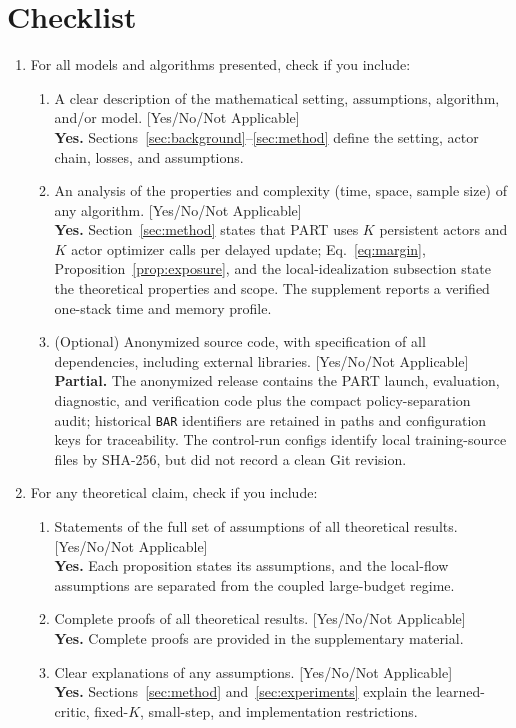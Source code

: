 \section*{Checklist}

\begin{enumerate}

  \item For all models and algorithms presented, check if you include:
  \begin{enumerate}
    \item A clear description of the mathematical setting, assumptions, algorithm, and/or model. [Yes/No/Not Applicable]\\
    \textbf{Yes.} Sections~\ref{sec:background}--\ref{sec:method} define the setting, actor chain, losses, and assumptions.
    \item An analysis of the properties and complexity (time, space, sample size) of any algorithm. [Yes/No/Not Applicable]\\
    \textbf{Yes.} Section~\ref{sec:method} states that PART uses $K$ persistent actors and $K$ actor optimizer calls per delayed update; Eq.~\eqref{eq:margin}, Proposition~\ref{prop:exposure}, and the local-idealization subsection state the theoretical properties and scope. The supplement reports a verified one-stack time and memory profile.
    \item (Optional) Anonymized source code, with specification of all dependencies, including external libraries. [Yes/No/Not Applicable]\\
    \textbf{Partial.} The anonymized release contains the PART launch, evaluation, diagnostic, and verification code plus the compact policy-separation audit; historical \texttt{BAR} identifiers are retained in paths and configuration keys for traceability. The control-run configs identify local training-source files by SHA-256, but did not record a clean Git revision.
  \end{enumerate}

  \item For any theoretical claim, check if you include:
  \begin{enumerate}
    \item Statements of the full set of assumptions of all theoretical results. [Yes/No/Not Applicable]\\
    \textbf{Yes.} Each proposition states its assumptions, and the local-flow assumptions are separated from the coupled large-budget regime.
    \item Complete proofs of all theoretical results. [Yes/No/Not Applicable]\\
    \textbf{Yes.} Complete proofs are provided in the supplementary material.
    \item Clear explanations of any assumptions. [Yes/No/Not Applicable]\\
    \textbf{Yes.} Sections~\ref{sec:method} and~\ref{sec:experiments} explain the learned-critic, fixed-$K$, small-step, and implementation restrictions.
  \end{enumerate}


\end{enumerate}
